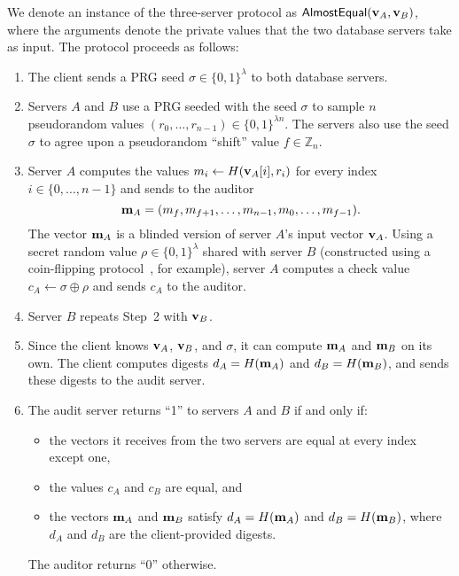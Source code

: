 \documentclass[10pt,twocolumn]{article}
\newcommand{\Z}{\mathbb{Z}}
\newcommand{\lbits}{\{0,1\}^\lambda}
\newcommand{\mA}{{\bf m}_A}
\newcommand{\mB}{{\bf m}_B}
\newcommand{\vA}{{\bf v}_A}
\newcommand{\vB}{{\bf v}_B}
\begin{document}
We denote an instance of the three-server
protocol as ${\sf AlmostEqual}({\bf v}_A, {\bf v}_B)$,
where the arguments denote the private values that 
the two database servers take as input.
The protocol proceeds as follows:
\begin{enumerate}
  \item The client sends a PRG seed $\sigma \in \lbits$ to both database servers.

  \item Servers $A$ and $B$ use a PRG seeded with the seed $\sigma$
        to sample $n$ pseudorandom values $(r_0, \dots, r_{n-1}) \in \{0,1\}^{\lambda n}$. 
        The servers also use the seed $\sigma$ to agree upon
        a pseudorandom ``shift'' value $f \in \Z_n$.
        
  \item Server $A$ computes the values $m_i \gets H({\bf v}_A[i], r_i)$
        for every index $i \in \{0, \dots, n-1\}$ and 
        sends to the auditor
        \[{\bf m}_A = (m_f, m_{f+1}, \dots, m_{n-1}, m_0, \dots, m_{f-1}).\] 
        The vector $\mA$ is a blinded version of server $A$'s input vector $\vA$.
        Using a secret random value $\rho \in \{0,1\}^\lambda$ shared with server $B$
        (constructed using a coin-flipping protocol~\cite{blum1983coin}, for example),
        server $A$ computes a check value
        ${c_A \gets \sigma \oplus \rho}$ and sends $c_A$ to the auditor.

  \item Server $B$ repeats Step~2 with ${\bf v}_B$.

  \item \label{step:clientsend}
        Since the client knows $\vA$, $\vB$, and $\sigma$, it can 
        compute $\mA$ and $\mB$ on its own.
        The client computes digests 
        $d_A = H({\bf m}_A)$ and $d_B = H({\bf m}_B)$,
        and sends these digests to the audit server.

  \item The audit server returns ``1'' to servers $A$ and $B$
        if and only if:
        \begin{itemize}
          \item the vectors it receives from the two
                servers are equal at every index except one, 
          \item the values $c_A$ and $c_B$ are equal, and
          \item the vectors ${\bf m}_A$ and ${\bf m}_B$ satisfy
                $d_A = H({\bf m}_A)$ and $d_B = H({\bf m}_B)$,
                where $d_A$ and $d_B$ are the client-provided digests. 
        \end{itemize}
        The auditor returns ``0'' otherwise.
        
\end{enumerate}
\end{document}
